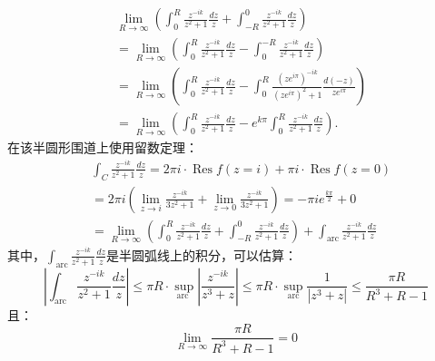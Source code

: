 \begin{equation}\label{A1}
    \begin{aligned}
        & \lim _{R \rightarrow \infty} (\int_{0 }^{R }\frac{z^{-ik}}{z^2+1}\frac{dz}{z} +\int_{-R }^{0 }\frac{z^{-ik}}{z^2+1}\frac{dz}{z}) \\
       & =\lim _{R \rightarrow \infty} (\int_{0 }^{R }\frac{z^{-ik}}{z^2+1}\frac{dz}{z} -\int_{0 }^{-R }\frac{z^{-ik}}{z^2+1}\frac{dz}{z})\\
       & =\lim _{R \rightarrow \infty} (\int_{0 }^{R }\frac{z^{-ik}}{z^2+1}\frac{dz}{z} -\int_{0 }^{R }\frac{(ze^{i\pi})^{-ik}}{(ze^{i\pi})^2+1}\frac{d(-z)}{ze^{i\pi}})\\
       &=\lim _{R \rightarrow \infty} (\int_{0 }^{R }\frac{z^{-ik}}{z^2+1}\frac{dz}{z} -e^{k\pi }\int_{0 }^{R }\frac{z^{-ik}}{z^2+1}\frac{dz}{z}).
       \end{aligned}
\end{equation}
在该半圆形围道上使用留数定理：
\begin{equation}\label{A-9}
    \begin{aligned}
        &\int_{C} \frac{z^{-ik}}{z^2+1}\frac{dz}{z} =2 \pi i \cdot \operatorname{Res} f(z=i)+\pi i \cdot \operatorname{Res} f(z=0)\\
        &=2\pi i (\lim _{z \rightarrow i}\frac{z^{-ik}}{3z^2+1}+\lim _{z \rightarrow 0}\frac{z^{-ik}}{3z^2+1})=-\pi ie^{\frac{k\pi}{2} } + 0\\
        &=\lim _{R \rightarrow \infty} (\int_{0 }^{R }\frac{z^{-ik}}{z^2+1}\frac{dz}{z} +\int_{-R }^{0 }\frac{z^{-ik}}{z^2+1}\frac{dz}{z}) +\int_{\mathrm{arc}} \frac{z^{-ik}}{z^2+1}\frac{dz}{z}  
        \end{aligned}
\end{equation}
    其中，$\int_{\mathrm{arc}} \frac{z^{-ik}}{z^2+1}\frac{dz}{z}  $是半圆弧线上的积分，可以估算：
        \begin{equation}
            \left|\int_{\mathrm{arc}} \frac{z^{-ik}}{z^2+1}\frac{dz}{z}  \right| \leq \pi R \cdot \sup _{\text {arc }}\left|\frac{z^{-ik}}{z^3+z}\right| \leq \pi R \cdot \sup _{\operatorname{arc}} \frac{1}{\left|z^3+z\right|} \leq \frac{\pi R}{R^3+R-1}
            \end{equation}
    且：
    \begin{equation}\label{}
        \lim _{R \rightarrow \infty} \frac{\pi R}{R^3+R-1}=0
    \end{equation}
